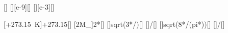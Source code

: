 [\degreeCelsius]
[\nano\meter][e-9][\meter]
[\gram\per\mole][e-3][\kilogram\per\mole]

[\vartheta+\SI{273.15}{\kelvin}]{\thSX+273.15}[\kelvin]
[2M_]{2*\MNaX}[\kilogram\per\mole]
[]{sqrt(3*\ncRX*\TSX/\MNzX)}[\mps]
[]{\lamX/\vSX}[\second]
[]{sqrt(8*\ncRX*\TSX/(pi*\MNzX))}[\mps]
[]{\lamX/\vbSX}[\second]
